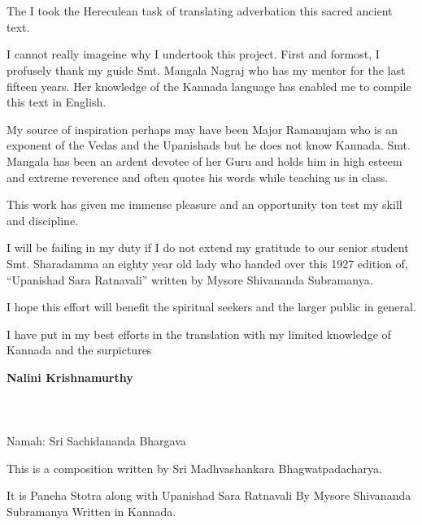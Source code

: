 
\chapter*{}

The I took the Hereculean task of translating adverbation this sacred ancient text.

I cannot really imageine why I undertook this project. First and formost, I profusely thank my guide Smt. Mangala Nagraj who has my mentor for the last fifteen years. Her knowledge of the Kannada language has enabled me to compile this text in English.

My source of inspiration perhaps may have been Major Ramanujam who is an exponent of the Vedas and the Upanishads but he does not know Kannada. Smt. Mangala has been an ardent devotee of her Guru and holds him in high esteem and extreme reverence and often quotes his words while teaching us in class.

This work has given me immense pleasure and an opportunity ton test my skill and discipline.

I will be failing in my duty if I do not extend my gratitude to our senior student Smt. Sharadamma an eighty year old lady who handed over this 1927 edition of, “Upanishad Sara Ratnavali” written by Mysore Shivananda Subramanya.

I hope this effort will benefit the spiritual seekers and the larger public in general.

I have put in my best efforts in the translation with my limited knowledge of Kannada and the surpictures

\begin{flushright}
\textbf{Nalini Krishnamurthy}
\end{flushright}

\delimiter

\chapter*{}

\begin{center}
\\ Namah: Sri Sachidananda Bhargava
\end{center}

This is a composition written by Sri Madhvashankara Bhagwatpadacharya.

It is Paneha Stotra along with Upanishad Sara Ratnavali By Mysore Shivananda Subramanya Written in Kannada.

